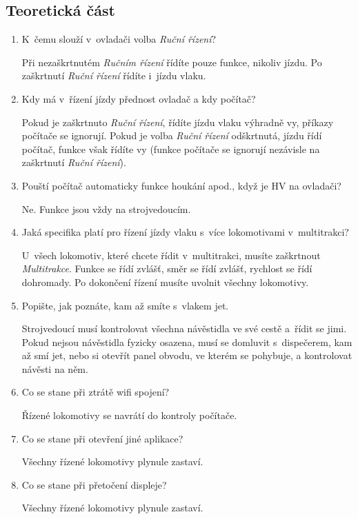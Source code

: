 \documentclass[12pt,a4paper]{article}
\def\solution#1{\ifsolution \par{\color{gray}#1}\fi}
\begin{document}
\subsection{Teoretická část}
\begin{enumerate}[leftmargin=*]
\item K~čemu slouží v~ovladači volba \textit{Ruční řízení}?
\solution{Při nezaškrtnutém \textit{Ručním řízení} řídíte pouze funkce, nikoliv
jízdu. Po zaškrtnutí \textit{Ruční řízení} řídíte i~jízdu vlaku.}

\item Kdy má v~řízení jízdy přednost ovladač a kdy počítač?
\solution{Pokud je zaškrtnuto \textit{Ruční řízení}, řídíte jízdu vlaku
výhradně vy, příkazy počítače se ignorují. Pokud je volba \textit{Ruční řízení}
odškrtnutá, jízdu řídí počítač, funkce však řídíte vy (funkce počítače se
ignorují nezávisle na zaškrtnutí \textit{Ruční řízení}).}

\item Pouští počítač automaticky funkce houkání apod., když je HV na ovladači?
\solution{Ne. Funkce jsou vždy na strojvedoucím.}

\item Jaká specifika platí pro řízení jízdy vlaku s~více lokomotivami v~multitrakci?
\solution{U~všech lokomotiv, které chcete řídit v~multitrakci, musíte
zaškrtnout \textit{Multitrakce}. Funkce se řídí zvlášť, směr se řídí zvlášť,
rychlost se řídí dohromady. Po dokončení řízení musíte uvolnit všechny
lokomotivy.}

\item Popište, jak poznáte, kam až smíte s~vlakem jet.
\solution{Strojvedoucí musí kontrolovat všechna návěstidla ve své cestě a~řídit
se jimi. Pokud nejsou návěstidla fyzicky osazena, musí se domluvit
s~dispečerem, kam až smí jet, nebo si otevřít panel obvodu, ve kterém se
pohybuje, a kontrolovat návěsti na něm.}

\item Co se stane při ztrátě wifi spojení?
\solution{Řízené lokomotivy se navrátí do kontroly počítače.}

\item Co se stane při otevření jiné aplikace?
\solution{Všechny řízené lokomotivy plynule zastaví.}

\item Co se stane při přetočení displeje?
\solution{Všechny řízené lokomotivy plynule zastaví.}

\end{enumerate}
\end{document}
